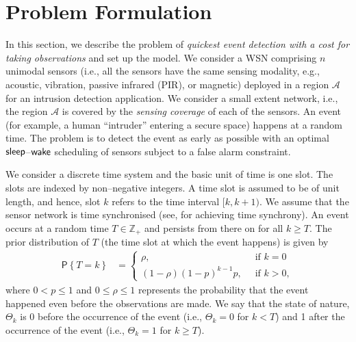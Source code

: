 \documentclass[journal]{IEEEtran}
\newcommand{\sleep}{{${\sf sleep }$}}
\newcommand{\PROB}[1]{\mathsf{P}\left\{#1\right\}}
\begin{document}
\section{Problem Formulation}
\label{sec:problem_formulation}
In this section, we describe the problem of {\em quickest event
detection with a cost for taking observations} and set up the model. We
consider a {\sf WSN} comprising $n$ unimodal sensors (i.e., all the
sensors have the same sensing modality, e.g., acoustic, vibration,
passive infrared (PIR), or magnetic) deployed in a region $\mathcal{A}$
for an intrusion detection application. We consider a small extent 
network, i.e., the region $\mathcal{A}$ is covered by the {\em sensing 
coverage} of each of the sensors. An event (for example, a human
``intruder'' entering a secure space) happens at a random time. The
problem is to detect the event as early as possible with an optimal
\sleep--${\sf wake}$ scheduling of sensors subject to a false alarm
constraint.  

We consider a discrete time system and the basic unit of time is one
slot. The slots are indexed by non--negative integers. A time slot is
assumed to be of unit length, and hence, slot $k$ refers to the time
interval $[k,k+1)$. We assume that the sensor network is time
synchronised (see, \cite{solis-etal06time-synch} for achieving time
synchrony). An event occurs at a random time $T \in \mathbb{Z}_+$ and
persists from there on for all $k \geqslant T$. The prior distribution
of $T$ (the time slot at which the event happens) is given by
\begin{align*}
\PROB{T=k} & = \left\{
                    \begin{array}{ll}
                    \rho, & \ \text{ if } k = 0\\ 
    (1-\rho)(1-p)^{k-1}p, & \ \text{ if } k > 0,  
                    \end{array}
             \right.
\end{align*}
where $0 < p \le 1$ and $0 \le \rho \le 1$ represents the probability 
that the event happened even before the observations are made. We say 
that the state of nature, $\Theta_k$ is 0 before the occurrence of the 
event (i.e., $\Theta_k = 0$ for $k < T$) and 1 after the occurrence of 
the event (i.e., $\Theta_k = 1$ for $k \ge T$). 
\end{document}
